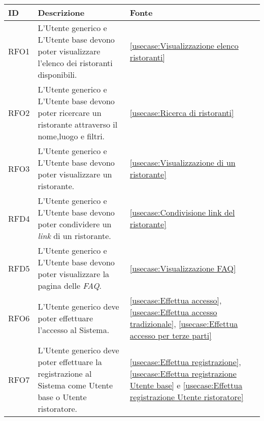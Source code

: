 \begin{table}[H]
	\renewcommand{\arraystretch}{1.5}
	\centering
	\begin{tabularx}{\textwidth}{l|X|p{2cm}}
		\textbf{ID} & \textbf{Descrizione}                                                                                       & \textbf{Fonte}                                                                                                                                               \\
		\hline
		RFO1        & L'Utente generico e L'Utente base devono poter visualizzare l'elenco dei ristoranti disponibili.           & \autoref{usecase:Visualizzazione elenco ristoranti}                                                                                                          \\
		\hline
		RFO2        & L'Utente generico e L'Utente base devono poter ricercare un ristorante attraverso il nome,luogo e filtri.  & \autoref{usecase:Ricerca di ristoranti}                                                                                                                      \\
		\hline
		RFO3        & L'Utente generico e L'Utente base devono poter visualizzare un ristorante.                                 & \autoref{usecase:Visualizzazione di un ristorante}                                                                                                           \\
		\hline
		RFD4        & L'Utente generico e L'Utente base devono poter condividere un \textit{link} di un ristorante.              & \autoref{usecase:Condivisione link del ristorante}                                                                                                           \\
		\hline
		RFD5        & L'Utente generico e L'Utente base devono poter visualizzare la pagina delle  \textit{\ac{FAQ}}.            & \autoref{usecase:Visualizzazione FAQ}                                                                                                                        \\
		\hline
		RFO6        & L'Utente generico deve poter effettuare l'accesso al Sistema.                                              & \autoref{usecase:Effettua accesso}, \autoref{usecase:Effettua accesso tradizionale}, \autoref{usecase:Effettua accesso per terze parti}                      \\
		\hline
		RFO7        & L'Utente generico deve poter effettuare la registrazione al Sistema come Utente base o Utente ristoratore. & \autoref{usecase:Effettua registrazione}, \autoref{usecase:Effettua registrazione Utente base} e \autoref{usecase:Effettua registrazione Utente ristoratore} \\

\end{tabularx}
\end{table}
